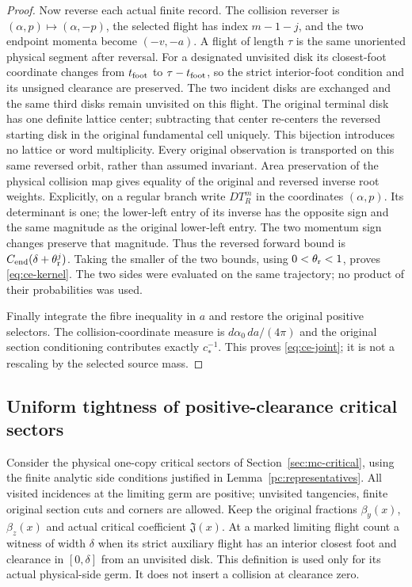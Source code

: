 \begin{proof}
Now reverse each actual finite record.  The collision
reverser is $(\alpha,p)\mapsto(\alpha,-p)$, the selected
flight has index $m-1-j$, and the two endpoint momenta
become $(-v,-a)$.  A flight of length $\tau$ is the same
unoriented physical segment after reversal.  For a designated
unvisited disk its closest-foot coordinate changes from
$t_{\rm foot}$ to $\tau-t_{\rm foot}$, so the strict
interior-foot condition and its unsigned clearance are
preserved.  The two incident disks are exchanged and the
same third disks remain unvisited on this flight.  The
original terminal disk has one definite lattice center;
subtracting that center re-centers the reversed starting
disk in the original fundamental cell uniquely.  This
bijection introduces no lattice or word multiplicity.
Every original observation is transported on this
same reversed orbit, rather than assumed invariant.
Area preservation of the physical
collision map gives equality of the original and reversed
inverse root weights.  Explicitly, on a regular branch write
$DT_R^m$ in the coordinates $(\alpha,p)$.  Its determinant
is one; the lower-left entry of its inverse has the opposite
sign and the same magnitude as the original lower-left
entry.  The two momentum sign changes preserve that
magnitude.  Thus the reversed forward bound is
$C_{\rm end}(\delta+\theta_{\rm r}^{j})$.
Taking the smaller of the two bounds, using
$0<\theta_{\rm r}<1$, proves \eqref{eq:ce-kernel}.
The two sides were evaluated on the same trajectory;
no product of their probabilities was used.

Finally integrate the fibre inequality in $a$ and restore
the original positive selectors.  The collision-coordinate
measure is $d\alpha_0\,da/(4\pi)$ and the original section
conditioning contributes exactly $c_*^{-1}$.  This proves
\eqref{eq:ce-joint}; it is not a rescaling by the selected
source mass.
\end{proof}

\subsection{Uniform tightness of positive-clearance critical sectors}

Consider the physical one-copy critical sectors of
Section~\ref{sec:mc-critical}, using the finite analytic
side conditions justified in Lemma~\ref{pc:representatives}.
All visited incidences at the limiting germ are positive;
unvisited tangencies, finite original section cuts and corners
are allowed.  Keep the original fractions $\beta_y(x)$,
$\beta_z(x)$ and actual critical coefficient $\mathfrak J(x)$.
At a marked limiting flight count a witness of width $\delta$
when its strict auxiliary flight has an interior closest foot
and clearance in $[0,\delta]$ from an unvisited disk.  This
definition is used only for its actual physical-side germ.
It does not insert a collision at clearance zero.

